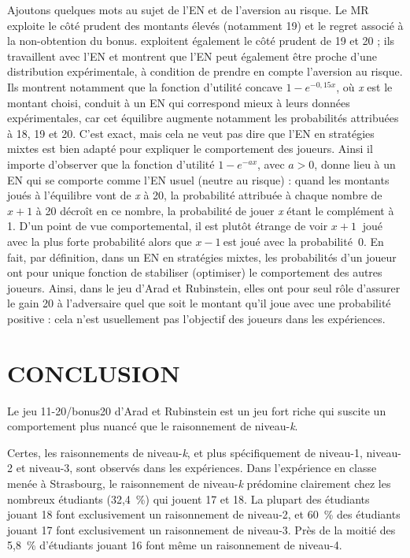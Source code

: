 \begin{Article}
\begin{refsection}[UmbhauerFR]
Ajoutons quelques mots au sujet de l'EN et de l'aversion au risque. Le
MR exploite le côté prudent des montants élevés (notamment 19) et le
regret associé à la non-obtention du bonus. \textcite{li2018}
exploitent également le côté prudent de 19 et 20 ; ils travaillent avec
l'EN et montrent que l'EN peut également être proche d'une distribution
expérimentale, à condition de prendre en compte l'aversion au risque.
Ils montrent notamment que la fonction d'utilité concave
\(1 - e^{- 0,15x}\), où \emph{x} est le montant choisi, conduit à un EN
qui correspond mieux à leurs données expérimentales, car cet équilibre
augmente notamment les probabilités attribuées à 18, 19 et 20. C'est
exact, mais cela ne veut pas dire que l'EN en stratégies mixtes est bien
adapté pour expliquer le comportement des joueurs. Ainsi il importe
d'observer que la fonction d'utilité \(1 - e^{- ax}\), avec \(a > 0\),
donne lieu à un EN qui se comporte comme l'EN usuel (neutre au risque) :
quand les montants joués à l'équilibre vont de \emph{x} à 20, la
probabilité attribuée à chaque nombre de \(x + 1\) à 20 décroît en ce
nombre, la probabilité de jouer \emph{x} étant le complément à 1. D'un
point de vue comportemental, il est plutôt étrange de voir \(x + 1\ \)
joué avec la plus forte probabilité alors que \(x - 1\ \)est joué avec
la probabilité~0. En fait, par définition, dans un EN en stratégies
mixtes, les probabilités d'un joueur ont pour unique fonction de
stabiliser (optimiser) le comportement des autres joueurs. Ainsi, dans
le jeu d'Arad et Rubinstein, elles ont pour seul rôle d'assurer le gain
20 à l'adversaire quel que soit le montant qu'il joue avec une
probabilité positive : cela n'est usuellement pas l'objectif des joueurs
dans les expériences.

\section{CONCLUSION}
\label{section:Conclusion Umbhauer_fr}

Le jeu 11-20/bonus20 d'Arad et Rubinstein est un jeu fort riche qui
suscite un comportement plus nuancé que le raisonnement de
niveau-\emph{k}.

Certes, les raisonnements de niveau-\emph{k}, et plus spécifiquement de
niveau-1, niveau-2 et niveau-3, sont observés dans les expériences. Dans
l'expérience en classe menée à Strasbourg, le raisonnement de
niveau-\emph{k} prédomine clairement chez les nombreux étudiants
(32,4~\%) qui jouent 17 et 18. La plupart des étudiants jouant 18 font
exclusivement un raisonnement de niveau-2, et 60~\% des étudiants jouant
17 font exclusivement un raisonnement de niveau-3. Près de la moitié des
5,8~\% d'étudiants jouant 16 font même un raisonnement de niveau-4.


\end{refsection}
\end{Article}
